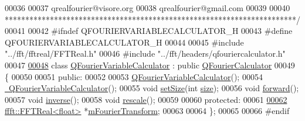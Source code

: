 \begin{DoxyCode}
00036 \textcolor{comment}{}
00037 \textcolor{comment}{qrealfourier@visore.org}
00038 \textcolor{comment}{qrealfourier@gmail.com}
00039 \textcolor{comment}{}
00040 \textcolor{comment}{***********************************************************************/}
00041 
00042 \textcolor{preprocessor}{#ifndef QFOURIERVARIABLECALCULATOR\_H}
00043 \textcolor{preprocessor}{#define QFOURIERVARIABLECALCULATOR\_H}
00044 
00045 \textcolor{preprocessor}{#include "../fft/fftreal/FFTReal.h"}
00046 \textcolor{preprocessor}{#include "../fft/headers/qfouriercalculator.h"}
00047 
\hypertarget{a00124_source_l00048}{}\hyperlink{a00055}{00048} \textcolor{keyword}{class }\hyperlink{a00055}{QFourierVariableCalculator} : \textcolor{keyword}{public} 
      \hyperlink{a00052}{QFourierCalculator}
00049 \{
00050 
00051     \textcolor{keyword}{public}:
00052 
00053         \hyperlink{a00055_a620f0850958df6f82854e0df6d2c5a0d}{QFourierVariableCalculator}();
00054         \hyperlink{a00055_ac98b83f9b6e72ac43a374a9f239d9de3}{~QFourierVariableCalculator}();
00055         \textcolor{keywordtype}{void} \hyperlink{a00055_a6de06a9ed2105755db1f92ec9c571b96}{setSize}(\textcolor{keywordtype}{int} \hyperlink{a00052_a76f0e0b1b3269d7267cd732b3e6ba3a5}{size});
00056         \textcolor{keywordtype}{void} \hyperlink{a00055_a605bd6c152a76c00f34ef8df715bce40}{forward}();
00057         \textcolor{keywordtype}{void} \hyperlink{a00055_ad84456e4b9a5fe21b9f1427ecc411f79}{inverse}();
00058         \textcolor{keywordtype}{void} \hyperlink{a00055_a663267f9addf061c6f869203e75e4d13}{rescale}();
00059 
00060     \textcolor{keyword}{protected}:
00061 
\hypertarget{a00124_source_l00062}{}\hyperlink{a00055_a87b5b3f4f70fd4b6221541066e662fbe}{00062}         \hyperlink{a00010}{ffft::FFTReal<float>} *\hyperlink{a00055_a87b5b3f4f70fd4b6221541066e662fbe}{mFourierTransform};
00063 
00064 \};
00065 
00066 \textcolor{preprocessor}{#endif}
\end{DoxyCode}
